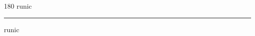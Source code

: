 
\begin{frame}
\begin{center}
\begin{turn}{180}
{\fontsize{2.5cm}{1em}\selectfont runic}
\end{turn}
\vspace{1em}\par  
\hrule
\vspace{1em}\par  
{\fontsize{2.5cm}{1em}\selectfont runic}
\end{center}
\end{frame}
